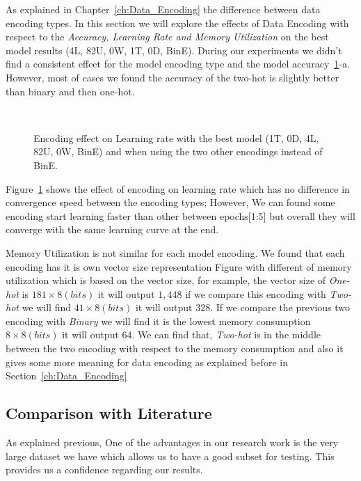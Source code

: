 As explained in Chapter~\ref{ch:Data_Encoding} the difference between data encoding types. In this section we will explore the effects of Data Encoding with respect to the \textit{Accuracy, Learning Rate and Memory Utilization} on the best model results (4L, 82U, 0W, 1T, 0D, BinE). During our experiments we didn't find a consistent effect for the model encoding type and the model accuracy~\ref{fig:Convergence_Memory}-a. However, most of cases we found the accuracy of the two-hot is slightly better than binary and then one-hot.


\begin{figure}[!t]
  \centering
  \begin{tikzpicture}
    
  \end{tikzpicture}
  \caption{Encoding effect on Learning rate with the best model (1T, 0D, 4L, 82U, 0W, BinE) and when using the two other encodings instead of BinE.}~\label{fig:Convergence_Memory}%
\end{figure}


Figure~\ref{fig:Convergence_Memory} shows the effect of encoding on learning rate which has no difference in convergence speed between the encoding types; However, We can found some encoding start learning faster than other between epochs[1:5] but overall they will converge with the same learning curve at the end.


Memory Utilization is not similar for each model encoding. We found that each encoding has it is own vector size representation Figure with different of memory utilization which is based on the vector size, for example, the vector size of \textit{One-hot} is $181 \times 8(bits)$ it will output $1,448$ if we compare this encoding with \textit{Two-hot} we will find $41 \times 8(bits)$ it will output $328$. If we compare the previous two encoding with \textit{Binary} we will find it is the lowest memory consumption $8 \times 8(bits)$ it will output $64$. We can find that, \textit{Two-hot} is in the middle between the two encoding with respect to the memory consumption and also it gives some more meaning for data encoding as explained before in Section~\ref{ch:Data_Encoding}

\subsection{Comparison with Literature}
As explained previous, One of the advantages in our research work is the very large dataset we have which allows us to have a good subset for testing. This provides us a confidence regarding our results.

